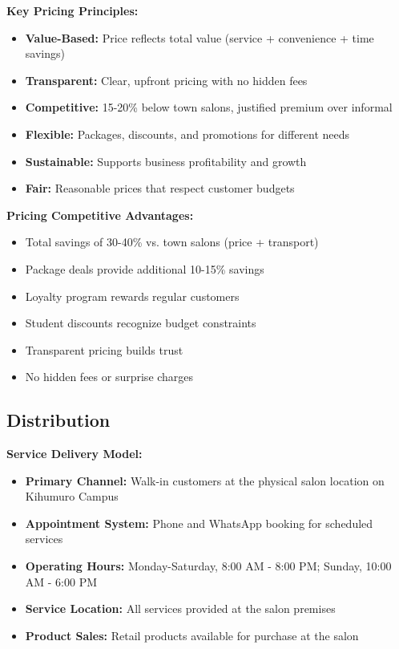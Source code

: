 \vspace{1em}

\begin{tcolorbox}[mybox, title=\textbf{Pricing Strategy Success Factors}]
\textbf{Key Pricing Principles:}
\begin{itemize}[leftmargin=1em, itemsep=0pt]
    \item \textbf{Value-Based:} Price reflects total value (service + convenience + time savings)
    \item \textbf{Transparent:} Clear, upfront pricing with no hidden fees
    \item \textbf{Competitive:} 15-20\% below town salons, justified premium over informal
    \item \textbf{Flexible:} Packages, discounts, and promotions for different needs
    \item \textbf{Sustainable:} Supports business profitability and growth
    \item \textbf{Fair:} Reasonable prices that respect customer budgets
\end{itemize}

\textbf{Pricing Competitive Advantages:}
\begin{itemize}[leftmargin=1em, itemsep=0pt]
    \item Total savings of 30-40\% vs. town salons (price + transport)
    \item Package deals provide additional 10-15\% savings
    \item Loyalty program rewards regular customers
    \item Student discounts recognize budget constraints
    \item Transparent pricing builds trust
    \item No hidden fees or surprise charges
\end{itemize}
\end{tcolorbox}

\subsection{Distribution}

\textbf{Service Delivery Model:}
\begin{itemize}[leftmargin=2em]
    \item \textbf{Primary Channel:} Walk-in customers at the physical salon location on Kihumuro Campus
    \item \textbf{Appointment System:} Phone and WhatsApp booking for scheduled services
    \item \textbf{Operating Hours:} Monday-Saturday, 8:00 AM - 8:00 PM; Sunday, 10:00 AM - 6:00 PM
    \item \textbf{Service Location:} All services provided at the salon premises
    \item \textbf{Product Sales:} Retail products available for purchase at the salon
\end{itemize}

